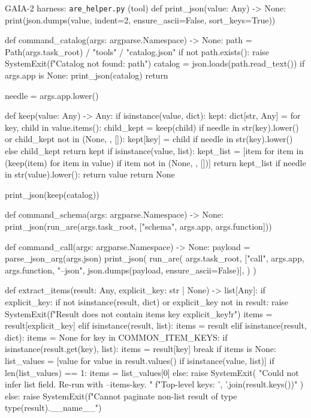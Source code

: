 \documentclass{llmxive}
\begin{document}
\begin{promptbox}{GAIA-2 harness: \texttt{are\_helper.py} (tool)}
def print_json(value: Any) -> None:
    print(json.dumps(value, indent=2, ensure_ascii=False, sort_keys=True))


def command_catalog(args: argparse.Namespace) -> None:
    path = Path(args.task_root) / "tools" / "catalog.json"
    if not path.exists():
        raise SystemExit(f"Catalog not found: {path}")
    catalog = json.loads(path.read_text())
    if args.app is None:
        print_json(catalog)
        return

    needle = args.app.lower()

    def keep(value: Any) -> Any:
        if isinstance(value, dict):
            kept: dict[str, Any] = {}
            for key, child in value.items():
                child_kept = keep(child)
                if needle in str(key).lower() or child_kept not in (None, {}, []):
                    kept[key] = child if needle in str(key).lower() else child_kept
            return kept
        if isinstance(value, list):
            kept_list = [item for item in (keep(item) for item in value) if item not in (None, {}, [])]
            return kept_list
        if needle in str(value).lower():
            return value
        return None

    print_json(keep(catalog))


def command_schema(args: argparse.Namespace) -> None:
    print_json(run_are(args.task_root, ["schema", args.app, args.function]))


def command_call(args: argparse.Namespace) -> None:
    payload = parse_json_arg(args.json)
    print_json(
        run_are(
            args.task_root,
            ["call", args.app, args.function, "--json", json.dumps(payload, ensure_ascii=False)],
        )
    )


def extract_items(result: Any, explicit_key: str | None) -> list[Any]:
    if explicit_key:
        if not isinstance(result, dict) or explicit_key not in result:
            raise SystemExit(f"Result does not contain items key {explicit_key!r}")
        items = result[explicit_key]
    elif isinstance(result, list):
        items = result
    elif isinstance(result, dict):
        items = None
        for key in COMMON_ITEM_KEYS:
            if isinstance(result.get(key), list):
                items = result[key]
                break
        if items is None:
            list_values = [value for value in result.values() if isinstance(value, list)]
            if len(list_values) == 1:
                items = list_values[0]
            else:
                raise SystemExit(
                    "Could not infer list field. Re-run with --items-key. "
                    f"Top-level keys: {', '.join(result.keys())}"
                )
    else:
        raise SystemExit(f"Cannot paginate non-list result of type {type(result).__name__}")


\end{promptbox}
\end{document}
